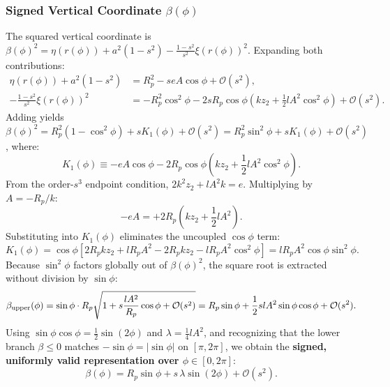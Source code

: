 \subsubsection{Signed Vertical Coordinate $\beta(\phi)$}
The squared vertical coordinate is $\beta(\phi)^2 = \eta(r(\phi)) + a^2(1 - s^2) - \frac{1 - s^2}{s^2}\xi(r(\phi))^2$. Expanding both contributions:
\begin{align}
    \eta(r(\phi)) + a^2(1 - s^2) &= R_p^2 - s e A \cos\phi + \mathcal{O}(s^2), \\
    -\frac{1 - s^2}{s^2}\xi(r(\phi))^2 &= -R_p^2\cos^2\phi - 2s R_p\cos\phi \left( k z_2 + \frac{1}{2} l A^2 \cos^2\phi \right) + \mathcal{O}(s^2).
\end{align}
Adding yields $\beta(\phi)^2 = R_p^2(1 - \cos^2\phi) + s K_1(\phi) + \mathcal{O}(s^2) = R_p^2\sin^2\phi + s K_1(\phi) + \mathcal{O}(s^2)$, where:
\begin{equation}
    K_1(\phi) \equiv -e A \cos\phi - 2 R_p\cos\phi \left( k z_2 + \frac{1}{2} l A^2 \cos^2\phi \right).
    \label{eq:K1_def}
\end{equation}
From the order-$s^3$ endpoint condition, $2k^2 z_2 + l A^2 k = e$. Multiplying by $A = -R_p/k$:
\begin{equation}
    -e A = +2 R_p \left( k z_2 + \frac{1}{2} l A^2 \right).
\end{equation}
Substituting into $K_1(\phi)$ eliminates the uncoupled $\cos\phi$ term:
\begin{equation}
    K_1(\phi) = \cos\phi \left[ 2 R_p k z_2 + l R_p A^2 - 2 R_p k z_2 - l R_p A^2 \cos^2\phi \right] = l R_p A^2 \cos\phi \sin^2\phi.
    \label{eq:K1_simplified}
\end{equation}
Because $\sin^2\phi$ factors globally out of $\beta(\phi)^2$, the square root is extracted without division by $\sin\phi$:
\begin{equation}
    \beta_{\rm upper}(\phi) = \sin\phi \cdot R_p \sqrt{1 + s \frac{l A^2}{R_p}\cos\phi + \mathcal{O}(s^2)} = R_p\sin\phi + \frac{1}{2} s l A^2 \sin\phi\cos\phi + \mathcal{O}(s^2).
\end{equation}
Using $\sin\phi\cos\phi = \frac{1}{2}\sin(2\phi)$ and $\lambda = \frac{1}{4} l A^2$, and recognizing that the lower branch $\beta \le 0$ matches $-\sin\phi = |\sin\phi|$ on $[\pi, 2\pi]$, we obtain the \textbf{signed, uniformly valid representation over $\phi \in [0, 2\pi]$}:
\begin{equation}
    \boxed{\beta(\phi) = R_p\sin\phi + s\,\lambda\sin(2\phi) + \mathcal{O}(s^2)}.
    \label{eq:beta_asymptotic_expansion}
\end{equation}

